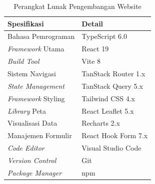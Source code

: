 \begin{table}[H]
\centering
\caption{Perangkat Lunak Pengembangan Website}
\label{tab:sw-web}
\begin{tabular}{|p{5cm}|p{8cm}|}
\hline
\textbf{Spesifikasi} & \textbf{Detail} \\ \hline
Bahasa Pemrograman        & TypeScript 6.0 \\ \hline
\textit{Framework} Utama  & React 19 \\ \hline
\textit{Build Tool}       & Vite 8 \\ \hline
Sistem Navigasi           & TanStack Router 1.x \\ \hline
\textit{State Management} & TanStack Query 5.x \\ \hline
\textit{Framework} Styling & Tailwind CSS 4.x \\ \hline
\textit{Library} Peta     & React Leaflet 5.x \\ \hline
Visualisasi Data          & Recharts 2.x \\ \hline
Manajemen Formulir        & React Hook Form 7.x \\ \hline
\textit{Code Editor}      & Visual Studio Code \\ \hline
\textit{Version Control}  & Git \\ \hline
\textit{Package Manager}  & npm \\ \hline
\end{tabular}
\end{table}
